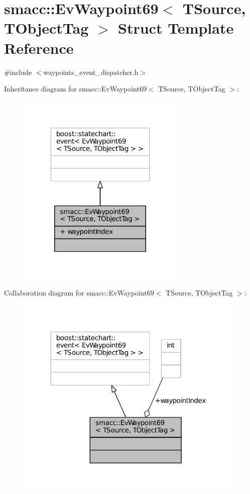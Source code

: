 \hypertarget{structsmacc_1_1EvWaypoint69}{}\section{smacc\+:\+:Ev\+Waypoint69$<$ T\+Source, T\+Object\+Tag $>$ Struct Template Reference}
\label{structsmacc_1_1EvWaypoint69}


{\ttfamily \#include $<$waypoints\+\_\+event\+\_\+dispatcher.\+h$>$}



Inheritance diagram for smacc\+:\+:Ev\+Waypoint69$<$ T\+Source, T\+Object\+Tag $>$\+:
\nopagebreak
\begin{figure}[H]
\begin{center}
\leavevmode
\includegraphics[width=227pt]{structsmacc_1_1EvWaypoint69__inherit__graph}
\end{center}
\end{figure}


Collaboration diagram for smacc\+:\+:Ev\+Waypoint69$<$ T\+Source, T\+Object\+Tag $>$\+:
\nopagebreak
\begin{figure}[H]
\begin{center}
\leavevmode
\includegraphics[width=312pt]{structsmacc_1_1EvWaypoint69__coll__graph}
\end{center}
\end{figure}

